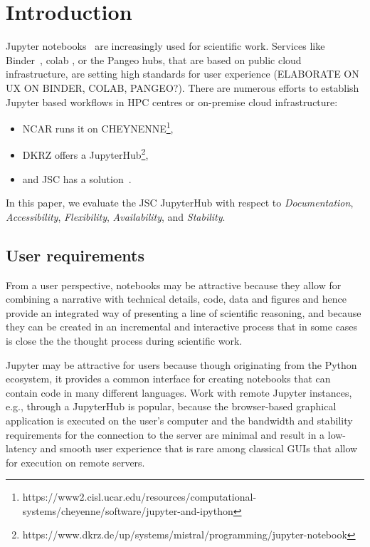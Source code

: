 
\section{Introduction}
\label{s-introductoin}

Jupyter notebooks~\citep{Kluyver2016} are increasingly used for scientific work.
Services like Binder~\citep{Jupyter2018}, colab \citep{Google2020, Carneiro2018}, or the Pangeo hubs\citep{robinson2019science}, that are based on public cloud infrastructure, are setting high standards for user experience (ELABORATE ON UX ON BINDER, COLAB, PANGEO?).
There are numerous efforts to establish Jupyter based workflows in HPC centres or on-premise cloud infrastructure:
\begin{itemize}
  \item NCAR runs it on CHEYNENNE\footnote{https://www2.cisl.ucar.edu/resources/computational-systems/cheyenne/software/jupyter-and-ipython},
  \item DKRZ offers a JupyterHub\footnote{https://www.dkrz.de/up/systems/mistral/programming/jupyter-notebook},
  \item and JSC has a solution~\citep{Goebbert2018}.
\end{itemize}

In this paper, we evaluate the JSC JupyterHub with respect to {\em Documentation}, {\em Accessibility}, {\em Flexibility}, {\em Availability}, and {\em Stability}.

\subsection{User requirements}

From a user perspective, notebooks may be attractive because they allow for combining a narrative with technical details, code, data and figures and hence provide an integrated way of presenting a line of scientific reasoning, and because they can be created in an incremental and interactive process that in some cases is close the the thought process during scientific work.

Jupyter may be attractive for users because though originating from the Python ecosystem, it provides a common interface for creating notebooks that can contain code in many different languages.  Work with remote Jupyter instances, e.g., through a JupyterHub is popular, because the browser-based graphical application is executed on the user's computer and the bandwidth and stability requirements for the connection to the server are minimal and result in a low-latency and smooth user experience that is rare among classical GUIs that allow for execution on remote servers.

